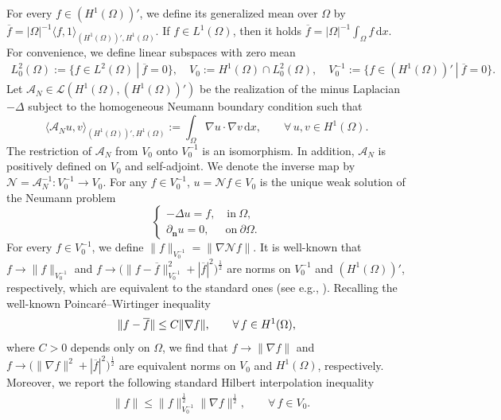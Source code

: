 \documentclass[11pt,reqno]{amsart}
\begin{document}
For every $f\in (H^1(\Omega))'$, we define its generalized mean over $\Omega$ by
$\overline{f}=|\Omega|^{-1} \langle f,1\rangle_{(H^1(\Omega))',H^1(\Omega)}$. If $f\in L^1(\Omega)$, then it holds $\overline{f}= |\Omega|^{-1} \int_\Omega f \,\mathrm{d}x$. For convenience, we define linear subspaces with zero mean
%
\begin{align*}
L^2_{0}(\Omega):=\big\{f\in L^2(\Omega)\ |\ \overline{f} =0\big\},
\quad
V_0:= H^1(\Omega)\cap L_0^2(\Omega),
\quad
V_0^{-1}:= \big\{ f \in (H^1(\Omega))'\ |\  \overline{f}=0 \big\}.
\end{align*}
%
Let $\mathcal{A}_N\in \mathcal{L}(H^1(\Omega),(H^1(\Omega))')$ be the realization of the minus Laplacian $-\Delta$ subject to the homogeneous Neumann boundary condition such that
%
\begin{equation}\nonumber
	\langle \mathcal{A}_N u,v\rangle_{(H^1(\Omega))',H^1(\Omega)} := \int_\Omega \nabla u\cdot \nabla v \, \mathrm{d}x,\qquad \forall\, u,v\in H^1(\Omega).
\end{equation}
%
The restriction of $\mathcal{A}_N$ from $V_0$ onto $V_0^{-1}$ is an isomorphism. In addition, $\mathcal{A}_N$ is positively defined on $V_0$ and self-adjoint. We denote the inverse map by $\mathcal{N} =\mathcal{A}_N^{-1}: V_0^{-1} \to V_0$. For any $f\in V_0^{-1}$, $u= \mathcal{N} f \in V_0$ is the unique weak solution of the Neumann problem
$$
\begin{cases}
	-\Delta u=f, \quad \text{in} \ \Omega,\\
	\partial_{\bm{n}} u=0, \quad \ \  \text{on}\ \partial \Omega.
\end{cases}
$$
For every $f\in V_0^{-1}$, we define $\|f\|_{V_0^{-1}}=\|\nabla \mathcal{N} f\|$.
It is well-known that $f \to \|f\|_{V_0^{-1}}$ and $
f \to\big(\|f-\overline{f}\|_{V_0^{-1}}^2+|\overline{f}|^2\big)^\frac12$
are norms on $V_0^{-1}$ and $(H^1(\Omega))'$,
respectively, which are equivalent to the standard ones (see e.g., \cite{MZ04}). Recalling the well-known Poincar\'{e}--Wirtinger inequality
%
\begin{equation}
	\notag
\|f-\overline{f}\|\leq C \|\nabla f\|,\qquad \forall\,f\in H^1(\Omega),
\end{equation}
%
where $C>0$ depends only on $\Omega$, we find that $f\to \|\nabla f\|$ and  $f\to \big(\|\nabla f\|^2+|\overline{f}|^2\big)^\frac12$  are equivalent norms on $V_0$ and $H^1(\Omega)$, respectively. Moreover, we report the following standard Hilbert interpolation inequality
%
\begin{align}
	&\|f\|  \leq \|f\|_{V_0^{-1}}^{\frac12} \| \nabla f\|^{\frac12},
	 \qquad  \forall\, f \in V_0.
\label{inter-1}
\end{align}
\end{document}
